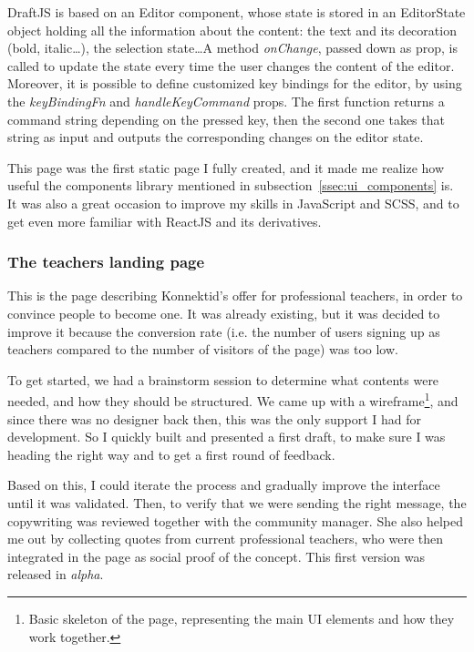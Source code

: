 DraftJS is based on an \guillemotleft{} Editor \guillemotright{} component, whose state is stored in an \guillemotleft{} EditorState \guillemotright{} object holding all the information about the content: the text and its decoration (bold, italic\ldots), the selection state\ldots A method \textit{onChange}, passed down as prop, is called to update the state every time the user changes the content of the editor. Moreover, it is possible to define customized key bindings for the editor, by using the \textit{keyBindingFn} and \textit{handleKeyCommand} props. The first function returns a command string depending on the pressed key, then the second one takes that string as input and outputs the corresponding changes on the editor state.

This page was the first static page I fully created, and it made me realize how useful the components library mentioned in {\sc subsection}~\ref{ssec:ui_components} is. It was also a great occasion to improve my skills in JavaScript and SCSS, and to get even more familiar with ReactJS and its derivatives.

\subsubsection{The teachers landing page}
\label{sssec:teachersPage}

This is the page describing Konnektid's offer for professional teachers, in order to convince people to become one. It was already existing, but it was decided to improve it because the conversion rate (i.e. the number of users signing up as teachers compared to the number of visitors of the page) was too low. 

To get started, we had a brainstorm session to determine what contents were needed, and how they should be structured. We came up with a wireframe\footnote{Basic skeleton of the page, representing the main UI elements and how they work together.}, and since there was no designer back then, this was the only support I had for development. So I quickly built and presented a first draft, to make sure I was heading the right way and to get a first round of feedback.

Based on this, I could iterate the process and gradually improve the interface until it was validated. Then, to verify that we were sending the right message, the copywriting was reviewed together with the community manager. She also helped me out by collecting quotes from current professional teachers, who were then integrated in the page as social proof of the concept. This first version was released in \textit{alpha}.


